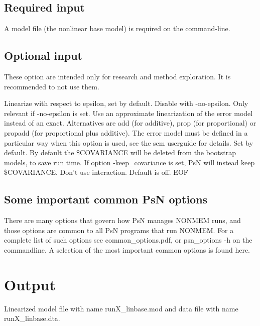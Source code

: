 \subsection{Required input}
A model file (the nonlinear base model) is required on the command-line.

\subsection{Optional input}
These option are intended only for research and method exploration.
It is recommended to not use them.
\begin{optionlist}
Linearize with respect to epsilon, set by default. Disable with -no-epsilon.
\nextopt
{}
Only relevant if -no-epsilon is set. 
Use an approximate linearization of the error model instead of an exact.
Alternatives are add (for additive), prop (for proportional) or
propadd (for proportional plus additive).
The error model must be defined in a particular way when this option is used,
see the scm userguide for details.
\nextopt
{}
Set by default. 
\nextopt
{}
      By default the \$COVARIANCE will be deleted from the bootstrap models, 
	  to save run time. If option -keep\_covariance is set, 
	  PsN will instead keep \$COVARIANCE.
\nextopt
        Don't use interaction. Default is off.
    \nextopt
EOF

\end{optionlist}

\subsection{Some important common PsN options}
There are many options that govern how PsN manages NONMEM runs, and
those options are common to all PsN programs that run NONMEM.
For a complete list of such options see common\_options.pdf, 
or psn\_options -h on the commandline. A selection of
the most important common options is found here.



\section{Output}
Linearized model file with name runX\_linbase.mod and data file with name runX\_linbase.dta.




